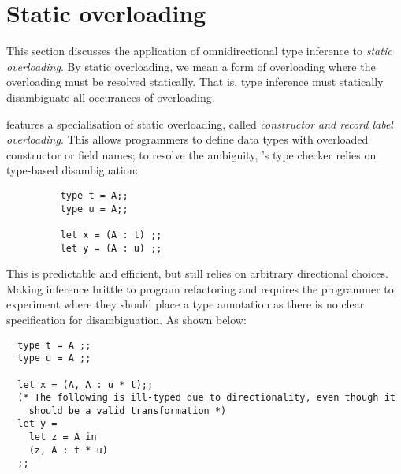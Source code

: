 \section{Static overloading}

This section discusses the application of omnidirectional type inference to \textit{static overloading}. 
By static overloading, we mean a form of overloading where the overloading must be resolved statically. That is, 
type inference must statically disambiguate all occurances of overloading. 



\OCaml features a specialisation of static overloading, called \textit{constructor and record label overloading}. 
This allows programmers to define data types with overloaded constructor or field names; to resolve the ambiguity, 
\OCaml's type checker relies on type-based disambiguation:
\begin{figure}[!htpb]
 \centering 
 \begin{verbatim}
    type t = A;;
    type u = A;; 

    let x = (A : t) ;;
    let y = (A : u) ;;
\end{verbatim}
\end{figure}
\FloatBarrier

This is predictable and efficient, but still relies on arbitrary directional choices. Making inference brittle to program refactoring and 
requires the programmer to experiment where they should place a type annotation as there is no clear specification for disambiguation. As shown below: 

\begin{verbatim}
  type t = A ;; 
  type u = A ;; 

  let x = (A, A : u * t);; 
  (* The following is ill-typed due to directionality, even though it 
    should be a valid transformation *)
  let y = 
    let z = A in 
    (z, A : t * u)
  ;;
\end{verbatim}

